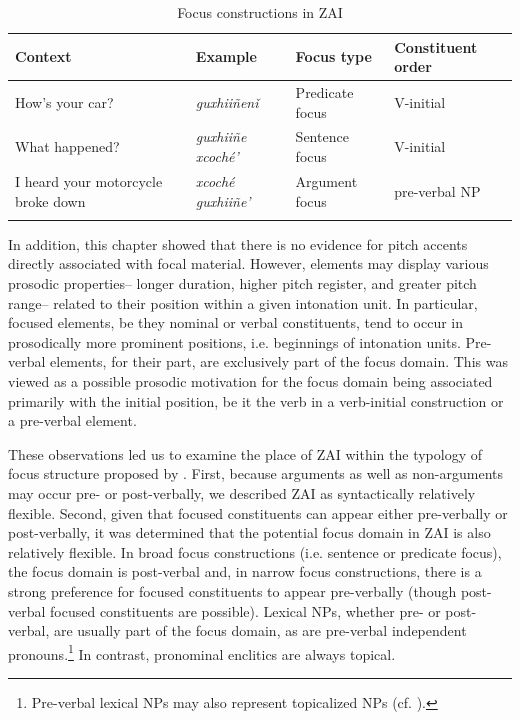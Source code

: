 \begin{table}
\caption{{Focus constructions in ZAI}}
\label{allfocus}
\begin{tabularx}{\textwidth}{X l  l l@{}} 
\lsptoprule
Context & Example & Focus type & Constituent order \\ 
\midrule 
How's your car? & \textit{guxhii\~{n}en\v{i}} &  {Predicate} {focus} &  {V-initial} \\ 
\tablevspace
What happened? & \textit{guxhii\~{n}e xcoch\'{e}'} &  {Sentence}  {focus}&  {V-initial} \\ 
\tablevspace
I heard your motorcycle broke down  & \textit{xcoch\'{e} guxhii\~{n}e'} &  {Argument}  {focus} & pre-verbal NP \\ 
 \lspbottomrule
 \end{tabularx}
\end{table}


In addition, this chapter showed that there is no evidence for pitch accents directly associated with focal material. However, elements may display various prosodic properties-- longer duration, higher pitch register, and greater pitch range-- related to their position within a given intonation unit. In particular, focused elements, be they nominal or verbal constituents, tend to occur in prosodically more prominent positions, i.e. beginnings of intonation units. Pre-verbal elements, for their part, are exclusively part of the focus domain. This was viewed as a possible prosodic motivation for the focus domain being associated primarily with the initial position, be it the verb in a verb-initial construction or a pre-verbal element.

These observations led us to examine the place of ZAI within the typology of focus structure proposed by \citet{vanvalin1999}. First, because arguments as well as non-arguments may occur pre- or post-verbally, we described ZAI as syntactically relatively flexible. Second, given that focused constituents can appear either pre-verbally or post-verbally, it was determined that the potential focus domain in ZAI is also relatively flexible. In broad focus constructions (i.e. sentence or predicate focus), the focus domain is post-verbal and, in narrow focus constructions, there is a strong preference for focused constituents to appear pre-verbally (though post-verbal focused constituents are possible). Lexical NPs, whether pre- or post-verbal, are usually part of the focus domain, as are pre-verbal independent pronouns.\footnote{Pre-verbal lexical NPs may also represent topicalized NPs (cf. ).} In contrast, pronominal enclitics are always topical. 

